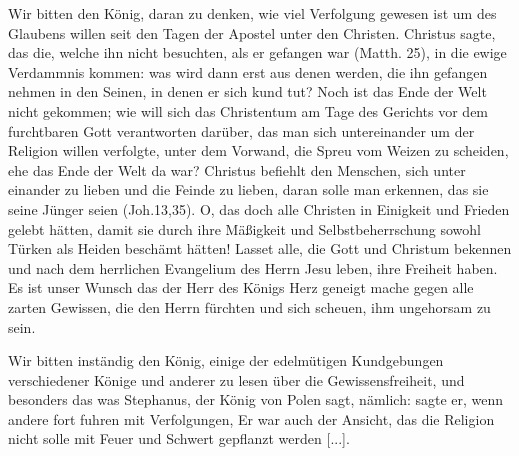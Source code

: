 {    Wir bitten den König, daran zu denken, wie viel Verfolgung
    gewesen ist um des Glaubens willen seit den Tagen der Apostel
    unter den Christen. Christus sagte, das die, welche ihn nicht 
    besuchten, als er gefangen war (Matth. 25), 
    in die ewige Verdammnis kommen: was wird 
    dann erst aus denen werden, die ihn
    gefangen nehmen in den Seinen, in denen er sich kund tut?
    Noch ist das Ende der Welt nicht gekommen; wie will sich das
    Christentum am Tage des Gerichts vor dem furchtbaren Gott
     verantworten darüber, das man sich untereinander um der Religion
    willen verfolgte, unter dem Vorwand, die Spreu vom Weizen zu
    scheiden, ehe das Ende der Welt da war? Christus befiehlt
    den Menschen, sich unter einander zu lieben und die Feinde zu
    lieben, daran solle man erkennen, das sie seine Jünger seien
    (Joh.13,35). O, das doch alle Christen in Einigkeit und Frieden
    gelebt hätten, damit sie durch ihre Mäßigkeit und Selbstbeherrschung 
    sowohl Türken als Heiden beschämt hätten! Lasset alle,
    die Gott und Christum bekennen und nach dem herrlichen Evangelium 
    des Herrn Jesu leben, ihre Freiheit haben. Es ist unser
    Wunsch das der Herr des Königs Herz geneigt mache gegen
    alle zarten Gewissen, die den Herrn fürchten und sich scheuen,
    ihm ungehorsam zu sein.

    Wir bitten inständig den König, einige der edelmütigen
    Kundgebungen verschiedener Könige und anderer zu lesen über
    die Gewissensfreiheit, und besonders das was Stephanus, der
    König von Polen sagt, nämlich: 
    sagte er, wenn andere fort fuhren mit Verfolgungen,  Er war auch der Ansicht,
    das die Religion nicht solle mit Feuer und Schwert gepflanzt
    werden [...].

}
